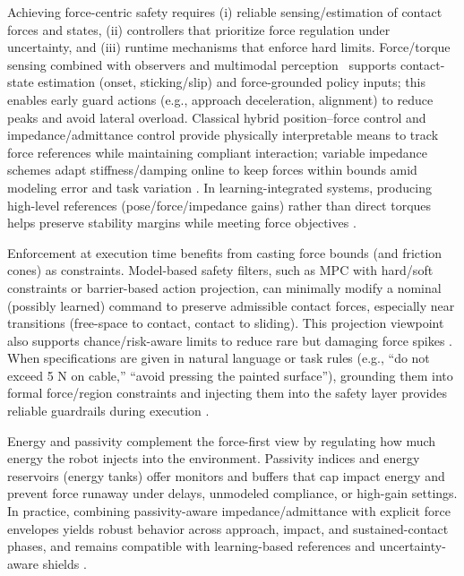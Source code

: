\documentclass[Afour,sageh,times]{template/sagej}
\begin{document}
Achieving force-centric safety requires (i) reliable sensing/estimation of contact forces and states, (ii) controllers that prioritize force regulation under uncertainty, and (iii) runtime mechanisms that enforce hard limits. Force/torque sensing combined with observers and multimodal perception~\cite{huang_unified_2025} supports contact-state estimation (onset, sticking/slip) and force-grounded policy inputs; this enables early guard actions (e.g., approach deceleration, alignment) to reduce peaks and avoid lateral overload. Classical hybrid position–force control and impedance/admittance control provide physically interpretable means to track force references while maintaining compliant interaction; variable impedance schemes adapt stiffness/damping online to keep forces within bounds amid modeling error and task variation \citep{ajoudani2018progress,calanca2015review}. In learning-integrated systems, producing high-level references (pose/force/impedance gains) rather than direct torques helps preserve stability margins while meeting force objectives \citep{ajoudani2018progress,yuan2022safe}.

Enforcement at execution time benefits from casting force bounds (and friction cones) as constraints. Model-based safety filters, such as MPC with hard/soft constraints or barrier-based action projection, can minimally modify a nominal (possibly learned) command to preserve admissible contact forces, especially near transitions (free-space to contact, contact to sliding). This projection viewpoint also supports chance/risk-aware limits to reduce rare but damaging force spikes \citep{yuan2022safe,29,152}. When specifications are given in natural language or task rules (e.g., “do not exceed 5 N on cable,” “avoid pressing the painted surface”), grounding them into formal force/region constraints and injecting them into the safety layer provides reliable guardrails during execution \citep{33,100}.

Energy and passivity complement the force-first view by regulating how much energy the robot injects into the environment. Passivity indices and energy reservoirs (energy tanks) offer monitors and buffers that cap impact energy and prevent force runaway under delays, unmodeled compliance, or high-gain settings. In practice, combining passivity-aware impedance/admittance with explicit force envelopes yields robust behavior across approach, impact, and sustained-contact phases, and remains compatible with learning-based references and uncertainty-aware shields \citep{ajoudani2018progress,calanca2015review,yuan2022safe}.
\end{document}

